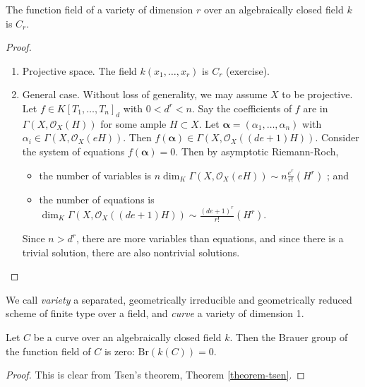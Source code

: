 \begin{theorem}
\label{theorem-tsen}
The function field of a variety of dimension $r$ over an algebraically closed
field $k$ is $C_r$.
\end{theorem}

\begin{proof}
\begin{enumerate}
\item
Projective space. The field $k(x_1, \ldots, x_r)$ is $C_r$ (exercise).
\item
General case. Without loss of generality, we may assume $X$ to be projective.
Let $f \in K[T_1, \dots, T_n]_d$ with $0 < d^r <n$. Say the coefficients of $f$
are in $\Gamma(X, \mathcal{O}_X(H))$ for some ample $H \subset X$. Let
$\mathbf{\alpha} = (\alpha_1, \dots, \alpha_n)$ with $\alpha_i \in \Gamma(X,
\mathcal{O}_X(eH))$. Then $f(\mathbf{\alpha}) \in \Gamma(X,
\mathcal{O}_X((de+1)H))$. Consider the system of equations $f(\mathbf{\alpha})
=0$. Then by asymptotic Riemann-Roch,
\begin{itemize}
\item
the number of variables is $n\dim_K \Gamma(X, \mathcal{O}_X(eH)) \sim
n\frac{e^r}{r!} (H^r)$ ; and
\item
the number of equations is $\dim_K \Gamma(X, \mathcal{O}_X((de+1)H)) \sim
\frac{(de+1)^r}{r!} (H^r).$
\end{itemize}
Since $n> d^r$, there are more variables than equations, and since there is a
trivial solution, there are also nontrivial solutions.
\end{enumerate}
\end{proof}

\begin{definition}
\label{definition-variety}
We call {\it variety} a separated, geometrically irreducible and geometrically
reduced scheme of finite type over a field, and {\it curve} a variety of
dimension 1.
\end{definition}

\begin{lemma}
\label{lemma-curve-brauer-zero}
Let $C$ be a curve over an algebraically closed field $k$. Then
the Brauer group of the function field of $C$ is zero:
$\text{Br}(k(C)) = 0$.
\end{lemma}

\begin{proof}
This is clear from Tsen's theorem,
Theorem \ref{theorem-tsen}.
\end{proof}

